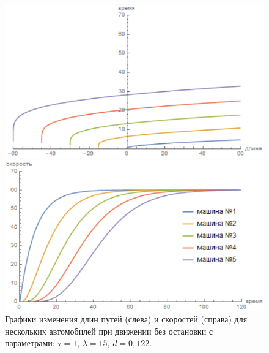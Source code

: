 \documentclass[12pt, a4paper]{extarticle}
\numberwithin{equation}{section}
\begin{document}
\begin{figure}[h!]
	\begin{center}
		\begin{minipage}[h!]{0.48\linewidth}
			\includegraphics[width=1\linewidth,height=0.2\textheight]
			{Images/distance_without_stop_d=0,122_tau=1.png}
		\end{minipage}
		\hfill 
		\begin{minipage}[h!]{0.48\linewidth}
			\includegraphics[width=1\linewidth,height=0.2\textheight]
			{Images/speed_without_stop_d=0,122_tau=1.png}
		\end{minipage}
		\caption{Графики изменения длин путей (слева) и скоростей (справа) для нескольких автомобилей при движении без остановки с параметрами: $\tau=1$, $\lambda=15$, $d=0,122$.}
		\label{without_stop_d=0,122_tau=1}
	\end{center}
\end{figure}
\end{document}
